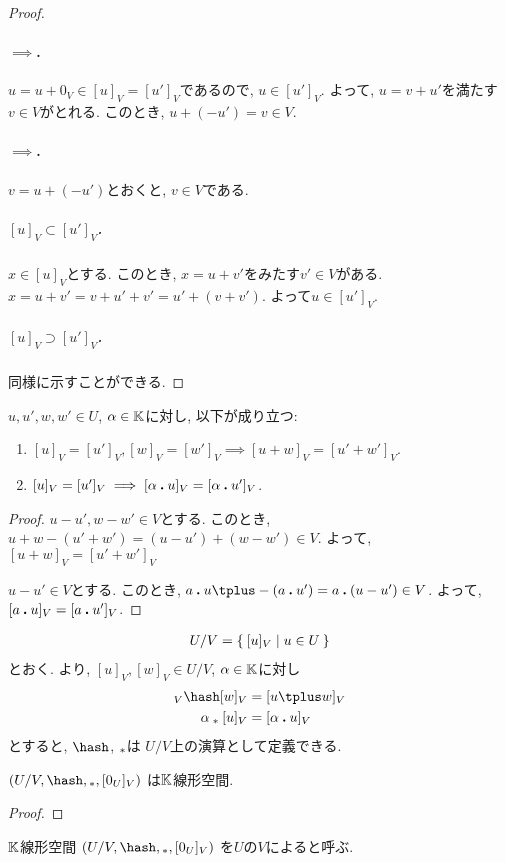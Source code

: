 \begin{proof}
\paragraph{$\implies$.}
$u=u+0_V\in [u]_V = [u']_V$であるので,
$u\in [u']_V$. よって, $u=v\plus u'$を満たす$v\in V$がとれる.
このとき, $u\plus (-u')=v\in V$.

\paragraph{$\implies$.}
$v=u\plus (-u')$とおくと, $v\in V$である.
\subparagraph{$[u]_V\subset [u']_V$.}
$x\in [u]_V$とする.
このとき, $x=u\plus v'$をみたす$v'\in V$がある.
$x=u+v'=v\plus u'\plus v'=u'\plus (v\plus v')$.
よって$u\in [u']_V$.
\subparagraph{$[u]_V\supset [u']_V$.}
同様に示すことができる.
\end{proof}

\begin{lemma}
\label{lem:quotientspace:well:def}
  $u,u',w,w'\in U$, $\alpha \in \mathbb{K}$に対し, 以下が成り立つ:  
  \begin{enumerate}
  \item $[u]_V=[u']_V, [w]_V=[w']_V \implies [u\plus w]_V=[u'\plus w']_V$.
  \item $[u]_V=[u']_V \implies [\alpha\mathbin{\boldsymbol{.}} u]_V=[\alpha\mathbin{\boldsymbol{.}} u']_V$.
  \end{enumerate}
\end{lemma}
\begin{proof}
$u-u',w-w'\in V$とする.
このとき,
$u\plus w-(u'\plus w')=(u-u')\plus (w-w')\in V$.
よって,
$[u\plus w]_V=[u'\plus w']_V$

$u-u'\in V$とする.
このとき,
$a\act u\plus-(a\act u')=a\act (u-u')\in V$.
よって,
$[a\mathbin{\boldsymbol{.}} u]_V=[a\mathbin{\boldsymbol{.}} u']_V$.
\end{proof}

\begin{align*}
  U/V=\Set{[u]_V|u\in U}
\end{align*}
とおく.
より,
$[u]_V,[w]_V\in U/V$, $\alpha\in\mathbb{K}$に対し
\begin{align*}
[u]_V\pplus [w]_V &= [u\plus w]_V\\
\alpha\aact [u]_V &= [\alpha\act u]_V
\end{align*}
とすると,
$\pplus$, $\mathbin{{}_\ast}$は
$U/V$上の演算として定義できる.
\begin{lemma}
  $(U/V,\pplus,\aact,[0_U]_V)$
  は$\mathbb{K}$線形空間.
\end{lemma}
\begin{proof}\end{proof}
\begin{definition}
  $\mathbb{K}$線形空間
  $(U/V,\pplus,\aact,[0_U]_V)$
  を$U$の$V$によると呼ぶ.
\end{definition}

